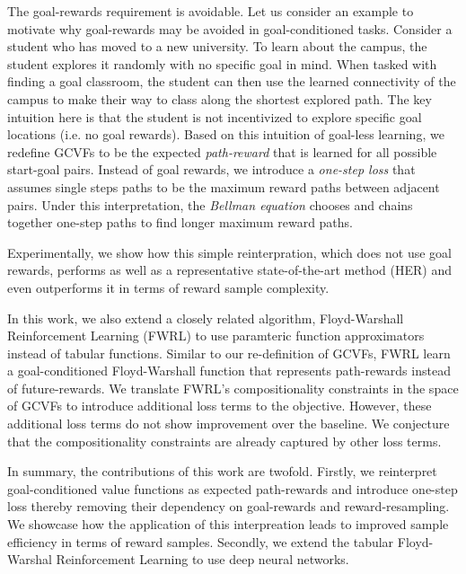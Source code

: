 The goal-rewards requirement is avoidable. Let us consider an example to
motivate why goal-rewards may be avoided in goal-conditioned tasks. Consider a
student who has moved to a new university. To learn about the campus,
the student explores it randomly with no specific goal in mind. When
tasked with finding a goal classroom, the student can then use the
learned connectivity of the campus to make their way to class along the
shortest explored path. The key intuition here is that the
student is not incentivized to explore specific goal locations (i.e. no
goal rewards). 
%
Based on this intuition of goal-less learning, we redefine GCVFs to be
the expected \emph{path-reward} that is learned for all possible
start-goal pairs. Instead of goal rewards, we  
introduce a \emph{one-step loss} that assumes single steps paths 
to be the maximum reward paths between adjacent pairs.
Under this interpretation, the \emph{Bellman equation} chooses and chains
together one-step paths to find longer maximum reward paths. 

%
Experimentally, we show how this simple reinterpration, which does not use goal
rewards, performs as well as a representative state-of-the-art method (HER) and
even outperforms it in terms of reward sample complexity.

In this work, we also extend a closely related algorithm, Floyd-Warshall Reinforcement
Learning (FWRL) \citep{dhiman2018floydwarshall} to use paramteric
function approximators instead of tabular functions. Similar to our
re-definition of GCVFs, FWRL learn a goal-conditioned Floyd-Warshall function
that represents path-rewards instead of future-rewards.
We translate FWRL's compositionality constraints in the space of GCVFs to introduce
additional loss terms to the objective. However, these additional loss
terms do not show improvement over the baseline. We conjecture that the
compositionality constraints are already captured by other loss terms. 

In summary, the  contributions of this work are twofold. Firstly, we
reinterpret goal-conditioned value functions as expected path-rewards
and introduce one-step loss thereby removing their dependency on
goal-rewards and reward-resampling. We showcase how the
application of this interpreation leads to improved sample efficiency in  terms
of reward samples.
Secondly, we extend the tabular Floyd-Warshal Reinforcement Learning to
use deep neural networks.


